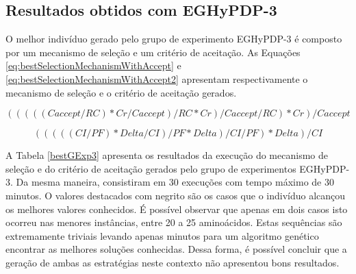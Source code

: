 	\subsection{Resultados obtidos com EGHyPDP-3}
	
	O melhor indivíduo gerado pelo grupo de experimento EGHyPDP-3 é composto por um mecanismo de seleção e um critério de aceitação. As Equações \ref{eq:bestSelectionMechanismWithAccept} e \ref{eq:bestSelectionMechanismWithAccept2} apresentam respectivamente o mecanismo de seleção e o critério de aceitação gerados.
	
	
	\begin{equation}
	\label{eq:bestSelectionMechanismWithAccept}
	( ( ( ( ( Caccept / RC ) * Cr / Caccept ) / RC * Cr ) / Caccept / RC ) * Cr ) / Caccept 
	\end{equation}
	
	
	\begin{equation}
	\label{eq:bestSelectionMechanismWithAccept2}
( ( ( ( ( CI / PF ) * Delta / CI ) / PF * Delta ) / CI / PF ) * Delta ) / CI
	\end{equation}
	
	
	A Tabela \ref{bestGExp3} apresenta os resultados da execução do mecanismo de seleção e do critério de aceitação gerados pelo grupo de experimentos EGHyPDP-3. Da mesma maneira, consistiram em 30 execuções com tempo máximo de 30 minutos. O valores destacados com negrito são os casos que o indivíduo alcançou os melhores valores conhecidos. É possível observar que apenas em dois casos isto ocorreu nas menores instâncias, entre 20 a 25 aminoácidos. Estas sequências são extremamente triviais levando apenas minutos para um  algoritmo genético encontrar as melhores soluções conhecidas. Dessa forma, é possível concluir que a geração de ambas as estratégias neste contexto não apresentou bons resultados. 
	
	\begin{table}[]
		\centering
		\caption{Resultados de 30 execuções do melhor indivíduo encontrado no grupo de experimento EGHyPDP-3}
		\label{bestGExp3}
	\end{table}
	
